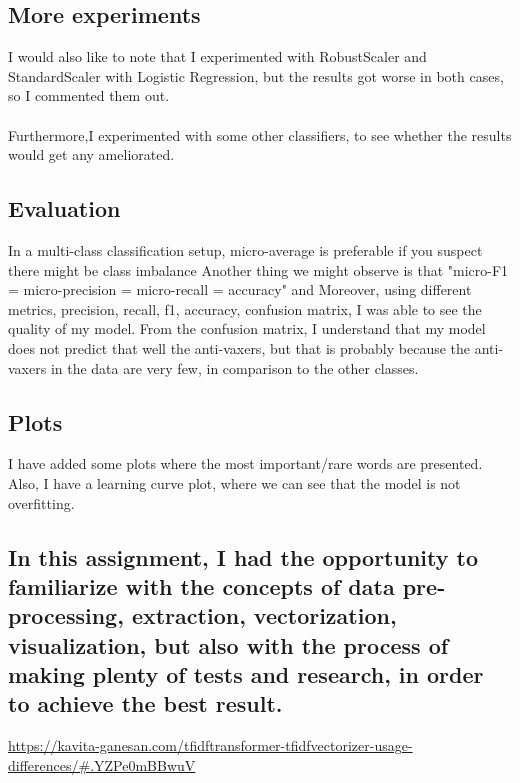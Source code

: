 \documentclass{article}
\begin{document}
\subsection{More experiments}
I would also like to note that I experimented with RobustScaler and StandardScaler with Logistic Regression, but the results got worse in both cases, so I commented them out. \\ \\
Furthermore,I experimented with some other classifiers, to see whether the results would get any ameliorated.

\subsection{Evaluation}
In a multi-class classification setup, micro-average is preferable if you suspect there might be class imbalance
Another thing we might observe is that "micro-F1 = micro-precision = micro-recall = accuracy" and 
Moreover, using different metrics, precision, recall, f1, accuracy, confusion matrix, I was able to see the quality of my model. From the confusion matrix, I understand that my model does not predict that well the anti-vaxers, but that is probably because the anti-vaxers in the data are very few, in comparison to the other classes.
\subsection{Plots}
I have added some plots where the most important/rare words are presented.
Also, I have a learning curve plot, where we can see that the model is not overfitting.
\subsection{In this assignment, I had the opportunity to familiarize with the concepts of data pre-processing, extraction, vectorization, visualization, but also with the process of making plenty of tests and research, in order to achieve the best result.}
\begin{thebibliography}{9}
\bibitem{}
\url{https://kavita-ganesan.com/tfidftransformer-tfidfvectorizer-usage-differences/#.YZPe0mBBwuV}
\end{thebibliography}
\end{document}
